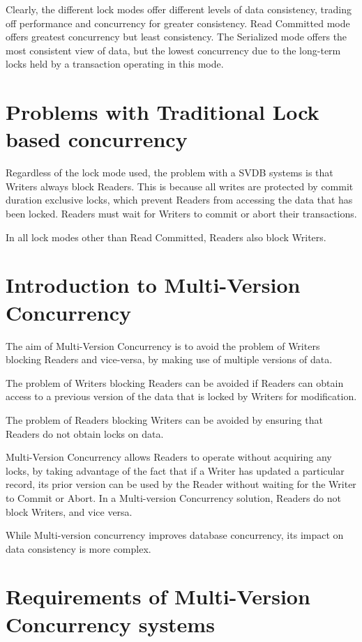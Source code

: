 \documentclass{article}
\begin{document}
Clearly, the different lock modes offer different levels of data
consistency, trading off performance and concurrency for greater
consistency. Read Committed mode offers greatest concurrency but
least consistency. The Serialized mode offers the most consistent
view of data, but the lowest concurrency due to the long-term locks
held by a transaction operating in this mode.

\section{Problems with Traditional Lock based concurrency}

Regardless of the lock mode used, the problem with a SVDB systems is
that Writers always block Readers. This is because all writes are
protected by commit duration exclusive locks, which prevent Readers
from accessing the data that has been locked. Readers must wait for
Writers to commit or abort their transactions.

In all lock modes other than Read Committed, Readers also block
Writers.

\section{Introduction to Multi-Version Concurrency}

The aim of Multi-Version Concurrency is to avoid the problem of
Writers blocking Readers and vice-versa, by making use of multiple
versions of data.

The problem of Writers blocking Readers can be avoided if Readers
can obtain access to a previous version of the data that is locked
by Writers for modification.

The problem of Readers blocking Writers can be avoided by ensuring
that Readers do not obtain locks on data.

Multi-Version Concurrency allows Readers to operate without
acquiring any locks, by taking advantage of the fact that if a
Writer has updated a particular record, its prior version can be
used by the Reader without waiting for the Writer to Commit or
Abort. In a Multi-version Concurrency solution, Readers do not block
Writers, and vice versa.

While Multi-version concurrency improves database concurrency, its
impact on data consistency is more complex\cite{crit}\cite{si}.

\section{Requirements of Multi-Version Concurrency systems}
\end{document}
